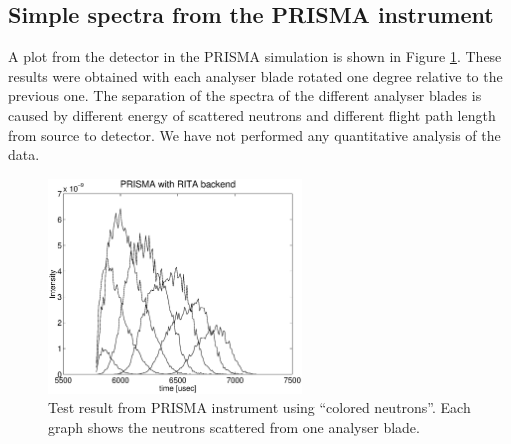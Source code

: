 \subsection{Simple spectra from the PRISMA instrument}
\label{data:PRISMA}

A plot from the detector in the PRISMA simulation is shown in Figure
\ref{f:PRISMAdata}. These results were obtained with each analyser blade
rotated one degree relative to the previous one. The separation of the
spectra of the different analyser blades is caused by different energy
of scattered neutrons and different flight path length from source to
detector.  We have not performed any quantitative analysis of the data.

\begin{figure}
  \begin{center}
    \includegraphics[width=0.6\textwidth]{figures/prisma2-a.eps}
  \end{center}
\caption{Test result from PRISMA instrument using ``colored
  neutrons''. Each graph shows the neutrons scattered from one analyser blade.}
\label{f:PRISMAdata}
\end{figure}
